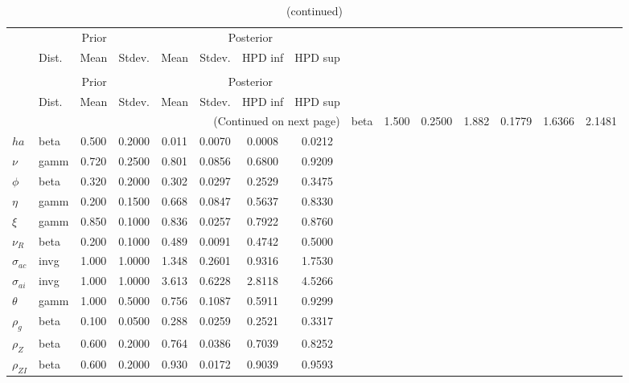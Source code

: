  
\begin{center}
\begin{longtable}{llcccccc} 
\caption{Results from Metropolis-Hastings (parameters)}
 \label{Table:MHPosterior:1}\\
\toprule 
  & \multicolumn{3}{c}{Prior}  &  \multicolumn{4}{c}{Posterior} \\
  \cmidrule(r{.75em}){2-4} \cmidrule(r{.75em}){5-8}
  & Dist. & Mean  & Stdev. & Mean & Stdev. & HPD inf & HPD sup\\
\midrule \endfirsthead 
\caption{(continued)}\\\toprule 
  & \multicolumn{3}{c}{Prior}  &  \multicolumn{4}{c}{Posterior} \\
  \cmidrule(r{.75em}){2-4} \cmidrule(r{.75em}){5-8}
  & Dist. & Mean  & Stdev. & Mean & Stdev. & HPD inf & HPD sup\\
\midrule \endhead 
\bottomrule \multicolumn{8}{r}{(Continued on next page)} \endfoot 
\bottomrule \endlastfoot 
${\sigma}$ & beta &   1.500 & 0.2500 &   1.882& 0.1779 &  1.6366 &  2.1481 \\ 
${ha}$ & beta &   0.500 & 0.2000 &   0.011& 0.0070 &  0.0008 &  0.0212 \\ 
$\nu$ & gamm &   0.720 & 0.2500 &   0.801& 0.0856 &  0.6800 &  0.9209 \\ 
${\phi}$ & beta &   0.320 & 0.2000 &   0.302& 0.0297 &  0.2529 &  0.3475 \\ 
${\eta}$ & gamm &   0.200 & 0.1500 &   0.668& 0.0847 &  0.5637 &  0.8330 \\ 
$\xi$ & gamm &   0.850 & 0.1000 &   0.836& 0.0257 &  0.7922 &  0.8760 \\ 
${\nu_R}$ & beta &   0.200 & 0.1000 &   0.489& 0.0091 &  0.4742 &  0.5000 \\ 
${\sigma_{ac}}$ & invg &   1.000 & 1.0000 &   1.348& 0.2601 &  0.9316 &  1.7530 \\ 
${\sigma_{ai}}$ & invg &   1.000 & 1.0000 &   3.613& 0.6228 &  2.8118 &  4.5266 \\ 
${\theta}$ & gamm &   1.000 & 0.5000 &   0.756& 0.1087 &  0.5911 &  0.9299 \\ 
${\rho_g}$ & beta &   0.100 & 0.0500 &   0.288& 0.0259 &  0.2521 &  0.3317 \\ 
${\rho_Z}$ & beta &   0.600 & 0.2000 &   0.764& 0.0386 &  0.7039 &  0.8252 \\ 
${\rho_{ZI}}$ & beta &   0.600 & 0.2000 &   0.930& 0.0172 &  0.9039 &  0.9593 \\ 

\end{longtable}
\end{center}
